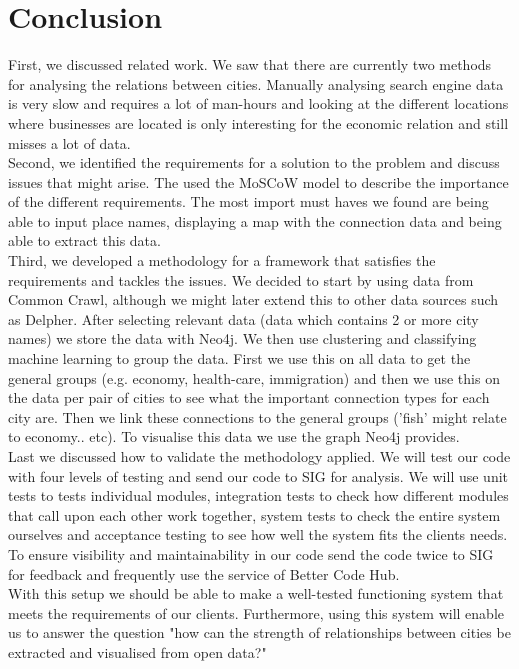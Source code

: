 \section{Conclusion}

First, we discussed related work. We saw that there are currently two methods for analysing the relations between cities. Manually analysing search engine data is very slow and requires a lot of man-hours and looking at the different locations where businesses are located is only interesting for the economic relation and still misses a lot of data.
\\

Second, we identified the requirements for a solution to the problem and discuss issues that might arise. The used the MoSCoW model to describe the importance of the different requirements. The most import must haves we found are being able to input place names, displaying a map with the connection data and being able to extract this data.
\\

Third, we developed a methodology for a framework that satisfies the requirements and tackles the issues. We decided to start by using data from Common Crawl, although we might later extend this to other data sources such as Delpher. After selecting relevant data (data which contains 2 or more city names) we store the data with Neo4j. We then use clustering and classifying machine learning to group the data. First we use this on all data to get the general groups (e.g. economy, health-care, immigration) and then we use this on the data per pair of cities to see what the important connection types for each city are. Then we link these connections to the general groups ('fish' might relate to economy.. etc). To visualise this data we use the graph Neo4j provides.
\\

Last we discussed how to validate the methodology applied. We will test our code with four levels of testing and send our code to SIG for analysis. We will use unit tests to tests individual modules, integration tests to check how different modules that call upon each other work together, system tests to check the entire system ourselves and acceptance testing to see how well the system fits the clients needs. To ensure visibility and maintainability in our code send the code twice to SIG for feedback and frequently use the service of Better Code Hub.
\\

With this setup we should be able to make a well-tested functioning system that meets the requirements of our clients. Furthermore, using this system will enable us to answer the question "how can the strength of relationships between cities be extracted and visualised from open data?" 